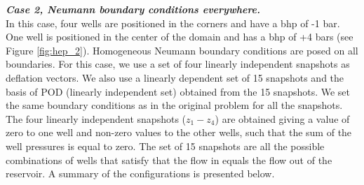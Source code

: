 \documentclass[12pt]{article}
\numberwithin{equation}{section}
\begin{document}
\textbf{\emph{Case 2, Neumann boundary conditions everywhere.}}\\
In this case, four wells are positioned in the corners and have a bhp of -1 bar. One well
is positioned in the center of the domain and has a bhp of +4 bars
(see Figure \ref{fig:hep_2}). Homogeneous Neumann boundary conditions are posed on all boundaries. For this case, we use a set of four linearly independent snapshots as deflation vectors. We also use a linearly dependent set of 15 snapshots and the basis of POD (linearly independent set) obtained from the 15 snapshots. We set the same boundary conditions as in the original problem for all the snapshots.
The four linearly independent snapshots ($z_1-z_4$) are obtained giving a value of zero to one well and non-zero values to the other wells, such that the sum of the well pressures is equal to zero. The set of 15 snapshots are all the possible combinations of wells that satisfy that the flow in equals the flow out of the reservoir.
A summary of the configurations is presented below.
\renewcommand{\arraystretch}{1.3}
\end{document}
